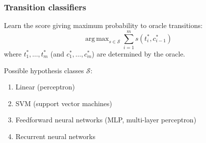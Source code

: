 \documentclass[t]{beamer}
\DeclareMathOperator*{\argmax}{arg\,max}
\begin{document}
\begin{frame}
    \frametitle{Transition classifiers}
    Learn the score giving maximum probability to oracle transitions:
    \[
    \argmax_{s\in\mathcal{S}}\sum_{i=1}^ms(t^*_i,c^*_{i-1})
    \]
    where $t^*_1,\ldots,t^*_m$ (and $c^*_1,\ldots,c^*_m$) are determined by the oracle.
    
    \pause\vfill
    
    Possible hypothesis classes $\mathcal{S}$:
    \begin{enumerate}
    \item Linear (perceptron)
    \item SVM (support vector machines)
    \item Feedforward neural networks (MLP, multi-layer perceptron)
    \item Recurrent neural networks
    \end{enumerate}
\end{frame}
\end{document}
